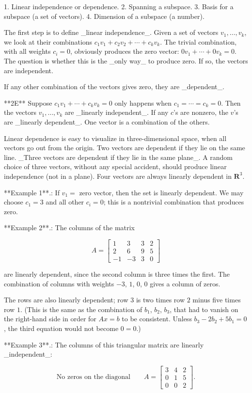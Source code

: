 1. Linear independence or dependence.
2. Spanning a subspace.
3. Basis for a subspace (a set of vectors).
4. Dimension of a subspace (a number).

The first step is to define _linear independence_. Given a set of vectors \(v_{1},\ldots,v_{k}\), we look at their combinations \(c_{1}v_{1}+c_{2}v_{2}+\cdots+c_{k}v_{k}\). The trivial combination, with all weights \(c_{i}=0\), obviously produces the zero vector: \(0v_{1}+\cdots+0v_{k}=0\). The question is whether this is the _only way_ to produce zero. If so, the vectors are independent.

If any other combination of the vectors gives zero, they are _dependent_.

**2E** Suppose \(c_{1}v_{1}+\cdots+c_{k}v_{k}=0\) only happens when \(c_{1}=\cdots=c_{k}=0\). Then the vectors \(v_{1},\ldots,v_{k}\) are _linearly independent_. If any \(c\)'s are nonzero, the \(v\)'s are _linearly dependent_. One vector is a combination of the others.

Linear dependence is easy to visualize in three-dimensional space, when all vectors go out from the origin. Two vectors are dependent if they lie on the same line. _Three vectors are dependent if they lie in the same plane_. A random choice of three vectors, without any special accident, should produce linear independence (not in a plane). Four vectors are always linearly dependent in \(\mathbf{R}^{3}\).

**Example 1**.: If \(v_{1}=\) zero vector, then the set is linearly dependent. We may choose \(c_{1}=3\) and all other \(c_{i}=0\); this is a nontrivial combination that produces zero.

**Example 2**.: The columns of the matrix

\[A=\begin{bmatrix}1&3&3&2\\ 2&6&9&5\\ -1&-3&3&0\end{bmatrix}\]

are linearly dependent, since the second column is three times the first. The combination of columns with weights \(-3\), \(1\), \(0\), \(0\) gives a column of zeros.

The rows are also linearly dependent; row \(3\) is two times row \(2\) minus five times row \(1\). (This is the same as the combination of \(b_{1}\), \(b_{2}\), \(b_{3}\), that had to vanish on the right-hand side in order for \(Ax=b\) to be consistent. Unless \(b_{3}-2b_{2}+5b_{1}=0\), the third equation would not become \(0=0\).)

**Example 3**.: The columns of this triangular matrix are linearly _independent_:

\[\text{{No zeros on the diagonal}}\qquad A=\begin{bmatrix}3&4&2\\ 0&1&5\\ 0&0&2\end{bmatrix}.\] 